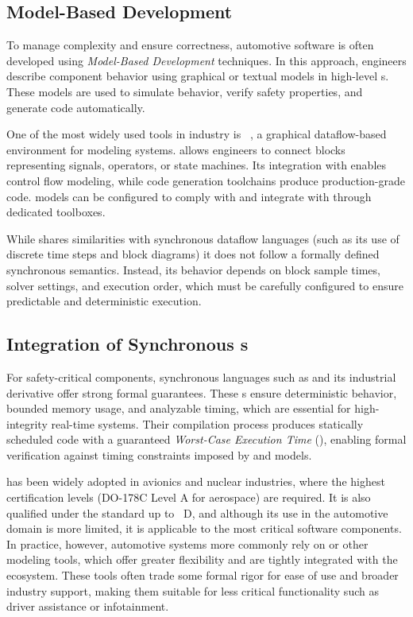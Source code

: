 \subsection{Model-Based Development}
\label{sec:intro:cars:mbd}

To manage complexity and ensure correctness, automotive software is often developed using
\emph{Model-Based Development} techniques. In this approach, engineers describe component behavior
using graphical or textual models in high-level \dsl{}s. These models are used to simulate behavior,
verify safety properties, and generate \Ci code automatically.

One of the most widely used tools in industry is \emph{\Simulink}~\cite{simulink}, a graphical
dataflow-based environment for modeling systems. \Simulink allows engineers to connect blocks
representing signals, operators, or state machines. Its integration with \Stateflow enables control
flow modeling, while code generation toolchains produce production-grade \Ci code. \Simulink models
can be configured to comply with \iso and integrate with \ausar through dedicated toolboxes.

While \Simulink shares similarities with synchronous dataflow languages (such as its use of discrete
time steps and block diagrams) it does not follow a formally defined synchronous semantics. Instead,
its behavior depends on block sample times, solver settings, and execution order, which must be
carefully configured to ensure predictable and deterministic execution.

\subsection{Integration of Synchronous \dsl{}s}
\label{sec:intro:cars:synchronous}

For safety-critical components, synchronous languages such as \Lustre and its industrial
derivative \Scade offer strong formal guarantees. These \dsl{}s ensure deterministic behavior,
bounded memory usage, and analyzable timing, which are essential for high-integrity real-time
systems. Their compilation process produces statically scheduled code with a guaranteed
\emph{Worst-Case Execution Time} (\wcet), enabling formal verification against timing constraints
imposed by \iso and \ausar models.

\Scade has been widely adopted in avionics and nuclear industries, where the highest certification
levels (\eg \textsc{DO-178C} Level A for aerospace) are required. It is also qualified under the
\iso standard up to \Asil~D, and although its use in the automotive domain is more limited,
it is applicable to the most critical software components. In practice, however, automotive systems
more commonly rely on \Simulink or other modeling tools, which offer greater flexibility and are
tightly integrated with the \ausar ecosystem. These tools often trade some formal rigor for
ease of use and broader industry support, making them suitable for less critical functionality such
as driver assistance or infotainment.

